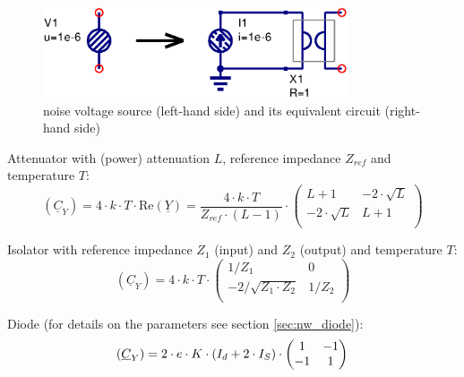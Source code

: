 \begin{figure}[ht]
\begin{center}
\includegraphics[width=9cm]{Unoise}
\end{center}
\caption{noise voltage source (left-hand side) and its equivalent circuit (right-hand side)}
\label{fig:Unoise}
\end{figure}
\FloatBarrier


Attenuator with (power) attenuation $L$, reference impedance $Z_{ref}$
and temperature $T$:
\begin{equation}
(\underline{C}_Y) = 4\cdot k\cdot T\cdot \textrm{Re}\left(\underline{Y}\right)
 = \frac{4\cdot k\cdot T}{Z_{ref}\cdot (L-1)} \cdot
\begin{pmatrix}
 L+1            & -2\cdot\sqrt{L} \\
-2\cdot\sqrt{L} &  L+1 \\
\end{pmatrix}
\end{equation}

Isolator with reference impedance $Z_1$ (input) and $Z_2$ (output) and
temperature $T$:
\begin{equation}
(\underline{C}_Y) = 4\cdot k\cdot T\cdot
\begin{pmatrix}
 1/Z_1                 & 0 \\
-2/\sqrt{Z_1\cdot Z_2} &  1/Z_2 \\
\end{pmatrix}
\end{equation}

Diode (for details on the parameters see section \ref{sec:nw_diode}):
\begin{equation}
(\underline{C}_Y)
 = 2\cdot e\cdot K\cdot \left(I_{d} + 2\cdot I_{S}\right)\cdot
\begin{pmatrix}
   1 & -1\\
  -1 &  1\\
\end{pmatrix}\\
\end{equation}

